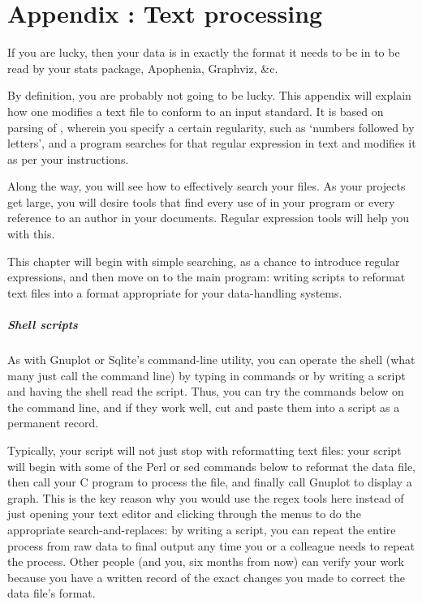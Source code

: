 \renewcommand\thechapter{\Alph{chapter}}
\setcounter{chapter}{1}
\setcounter{section}{0}
\setcounter{subsection}{0}
\setcounter{ex}{0}
\chapter{Appendix \thechapter: Text processing} \label{textappendix}

If you are lucky, then your data is in exactly the format it needs to be
in to be read by your stats package, Apophenia, Graphviz, \&c.

By definition, you are probably not going to be lucky. This appendix will
explain how one modifies a text file to conform to an input standard. It
is based on parsing of , wherein you specify a
certain regularity, such as `numbers followed by letters', and a program
searches for that regular expression in text and modifies it as per
your instructions.

Along the way, you will see how to effectively search your files. As
your projects get large, you will desire tools that find every use of
 in your program or every reference to an author in
your documents. Regular expression tools will help you with this.

This chapter will begin with simple searching, as a chance to introduce
regular expressions, and then move on to the main program: writing
scripts to reformat text files into a format appropriate for your
data-handling systems.

\paragraph{Shell scripts} As with Gnuplot or Sqlite's command-line
utility, you can operate the shell (what many just call the command line)
by typing in commands or by writing a script and having the shell read
the script. Thus, you can try the commands below on the command line,
and if they work well, cut and paste them into a script as a permanent
record. 

Typically, your script will not just stop with reformatting text files:
your script will begin with some of the Perl or sed commands below to
reformat the data file, then call your C program to process the file, and
finally call Gnuplot to display a graph. This is the key reason why you
would use the regex tools here instead of just opening your text editor
and clicking through the menus to do the appropriate search-and-replaces:
by writing a script, you can repeat the entire process from raw data to
final output any time you or a colleague needs to repeat the process.
Other people (and you, six months from now) can verify your work because
you have a written record of the exact changes you made to correct the
data file's format.

